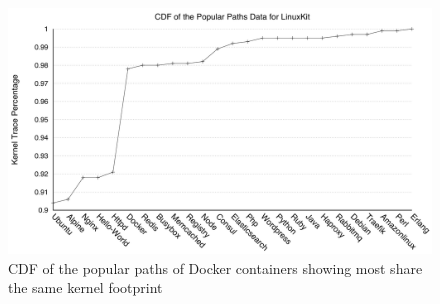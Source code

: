 \begin{figure}
\centering
\includegraphics[width=1.5\columnwidth]{diagram/pp-cdf.png}
\caption{\small CDF of the popular paths of Docker containers showing most share the same kernel footprint}
\label{fig:pp-cdf}
\end{figure}

